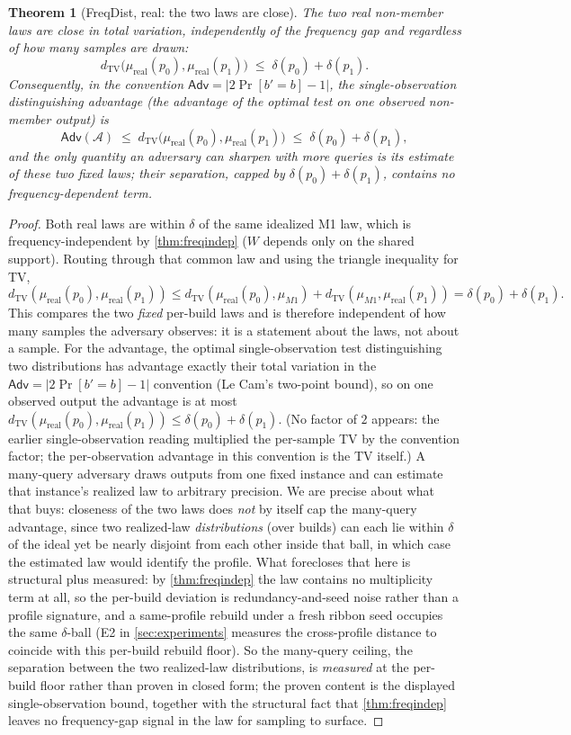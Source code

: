 \documentclass[11pt]{article}
\theoremstyle{definition}
\theoremstyle{plain}
\newtheorem{theorem}{Theorem}[section]
\theoremstyle{remark}
\newcommand{\TV}{d_{\mathrm{TV}}}
\newcommand{\W}{W}                          %
\newcommand{\Adv}{\mathsf{Adv}}             %
\newcommand{\lawreal}{\mu_{\mathrm{real}}}  %
\newcommand{\lawM}{\mu_{M1}}                %
\begin{document}
\begin{theorem}[FreqDist, real: the two laws are close]
\label{thm:freqdist-real}
The two real non-member laws are close in total variation, independently of the frequency gap and
regardless of how many samples are drawn:
\[
  \TV\big(\lawreal(p_0), \lawreal(p_1)\big) \;\le\; \delta(p_0) + \delta(p_1).
\]
Consequently, in the convention $\Adv = |2\Pr[b'=b]-1|$, the single-observation
distinguishing advantage (the advantage of the optimal test on one observed non-member
output) is
\[
  \Adv(\mathcal{A}) \;\le\; \TV\big(\lawreal(p_0), \lawreal(p_1)\big)
  \;\le\; \delta(p_0) + \delta(p_1),
\]
and the only quantity an adversary can sharpen with more queries is its estimate of these
two \emph{fixed} laws; their separation, capped by $\delta(p_0)+\delta(p_1)$, contains no
frequency-dependent term.
\end{theorem}

\begin{proof}
Both real laws are within $\delta$ of the same idealized M1 law, which is
frequency-independent by \cref{thm:freqindep} ($\W$ depends only on the shared support).
Routing through that common law and using the triangle inequality for TV,
\[
  \TV(\lawreal(p_0), \lawreal(p_1))
  \le \TV(\lawreal(p_0), \lawM) + \TV(\lawM, \lawreal(p_1))
  = \delta(p_0) + \delta(p_1).
\]
This compares the two \emph{fixed} per-build laws and is therefore independent of how many
samples the adversary observes: it is a statement about the laws, not about a sample. For
the advantage, the optimal single-observation test distinguishing two distributions has
advantage exactly their total variation in the $\Adv = |2\Pr[b'=b]-1|$ convention (Le Cam's
two-point bound), so on one observed output the advantage is at most
$\TV(\lawreal(p_0), \lawreal(p_1)) \le \delta(p_0) + \delta(p_1)$. (No factor of $2$
appears: the earlier single-observation reading multiplied the per-sample TV by the
convention factor; the per-observation advantage in this convention is the TV itself.)
A many-query adversary draws outputs from one fixed instance and can estimate that
instance's realized law to arbitrary precision. We are precise about what that buys:
closeness of the two laws does \emph{not} by itself cap the many-query advantage, since two
realized-law \emph{distributions} (over builds) can each lie within $\delta$ of the ideal yet
be nearly disjoint from each other inside that ball, in which case the estimated law would
identify the profile. What forecloses that here is structural plus measured: by
\cref{thm:freqindep} the law contains no multiplicity term at all, so the per-build deviation
is redundancy-and-seed noise rather than a profile signature, and a same-profile rebuild under
a fresh ribbon seed occupies the same $\delta$-ball (E2 in \cref{sec:experiments} measures the
cross-profile distance to coincide with this per-build rebuild floor). So the many-query
ceiling, the separation between the two realized-law distributions, is \emph{measured} at the
per-build floor rather than proven in closed form; the proven content is the displayed
single-observation bound, together with the structural fact that \cref{thm:freqindep} leaves
no frequency-gap signal in the law for sampling to surface.
\end{proof}
\end{document}
